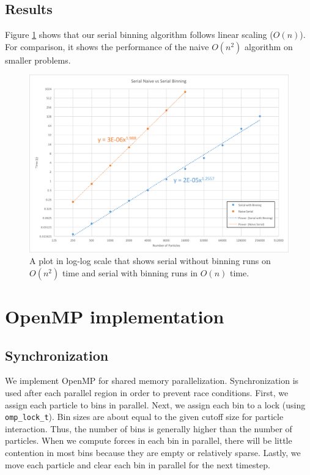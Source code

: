 \documentclass[12pt]{article}
\begin{document}
\subsection{Results}
Figure \ref{fig:serial-on} shows that our serial binning algorithm follows linear scaling ($O(n)$). For comparison, it shows the performance of the naive $O(n^2)$ algorithm on smaller problems.

\begin{figure}
 \includegraphics[width=\textwidth]{graphs/serial_binning_vs_naive.png}
  \caption{A plot in log-log scale that shows serial without binning runs on $O(n^2)$ time and serial with binning runs in $O(n)$ time.}
  \label{fig:serial-on}
\end{figure}

\section{OpenMP implementation}

\subsection{Synchronization}

We implement OpenMP for shared memory parallelization. Synchronization is used after each parallel region in order to prevent race conditions. First, we assign each particle to bins in parallel. Next, we assign each bin to a lock (using \texttt{omp\_lock\_t}). Bin sizes are about equal to the given cutoff size for particle interaction. Thus, the number of bins is generally higher than the number of particles. When we compute forces in each bin in parallel, there will be little contention in most bins because they are empty or relatively sparse. Lastly, we move each particle and clear each bin in parallel for the next timestep. 
\end{document}
